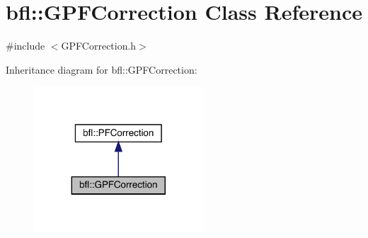 \hypertarget{classbfl_1_1GPFCorrection}{}\section{bfl\+:\+:G\+P\+F\+Correction Class Reference}
\label{classbfl_1_1GPFCorrection}


{\ttfamily \#include $<$G\+P\+F\+Correction.\+h$>$}



Inheritance diagram for bfl\+:\+:G\+P\+F\+Correction\+:
\nopagebreak
\begin{figure}[H]
\begin{center}
\leavevmode
\includegraphics[width=179pt]{classbfl_1_1GPFCorrection__inherit__graph}
\end{center}
\end{figure}
